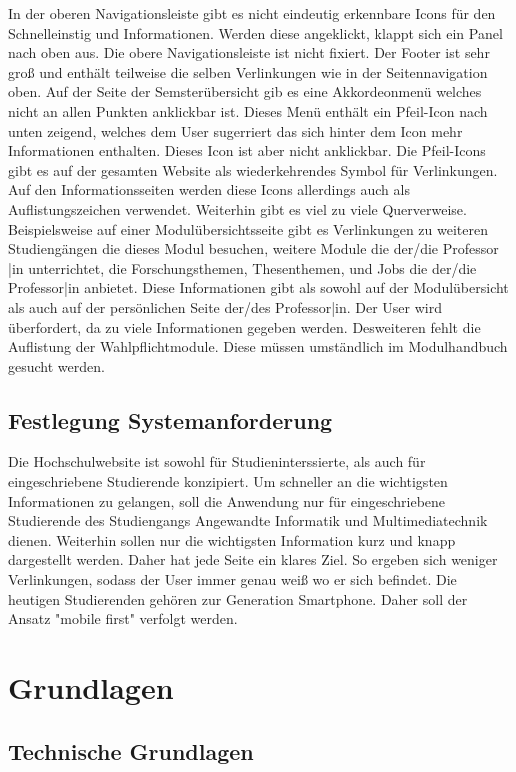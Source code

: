 \documentclass[12pt,					%
							 oneside,			%
							 a4paper,			%
							 halfparskip,		%
							 liststotoc,			%
							 bibtotoc,			%
							 fleqn,				%
							 pointlessnumbers]	%
							 {scrreprt}
\begin{document}
		In der oberen Navigationsleiste gibt es nicht eindeutig erkennbare Icons für den Schnelleinstig und Informationen. Werden diese angeklickt, klappt sich ein Panel nach oben aus. Die obere Navigationsleiste ist nicht fixiert. Der Footer ist sehr groß und enthält teilweise die selben Verlinkungen wie in der Seitennavigation oben. Auf der Seite der Semsterübersicht gib es eine Akkordeonmenü welches nicht an allen Punkten anklickbar ist. Dieses Menü enthält ein Pfeil-Icon nach unten zeigend, welches dem User sugerriert das sich hinter dem Icon mehr Informationen enthalten.  Dieses Icon ist aber nicht anklickbar. Die Pfeil-Icons gibt es auf der gesamten Website als wiederkehrendes Symbol für Verlinkungen. Auf den Informationsseiten werden diese Icons allerdings auch als Auflistungszeichen verwendet. Weiterhin gibt es viel zu viele Querverweise. Beispielsweise auf einer Modulübersichtsseite gibt es Verlinkungen zu weiteren Studiengängen die dieses Modul besuchen, weitere Module die der/die Professor |in unterrichtet, die Forschungsthemen, Thesenthemen, und Jobs die der/die Professor|in anbietet. Diese Informationen gibt als sowohl auf der Modulübersicht als auch auf der persönlichen Seite der/des Professor|in. Der User wird überfordert, da zu viele Informationen gegeben werden. Desweiteren fehlt die Auflistung der Wahlpflichtmodule. Diese müssen umständlich im Modulhandbuch gesucht werden. 
		
		\section{Festlegung Systemanforderung}
		Die Hochschulwebsite ist sowohl für Studieninterssierte, als auch für eingeschriebene Studierende konzipiert. Um schneller an die wichtigsten Informationen zu gelangen, soll die Anwendung nur für eingeschriebene Studierende des Studiengangs Angewandte Informatik und Multimediatechnik dienen. Weiterhin sollen nur die wichtigsten Information kurz und knapp dargestellt werden. Daher hat jede Seite ein klares Ziel.	So ergeben sich weniger Verlinkungen, sodass der User immer genau weiß wo er sich befindet. Die heutigen Studierenden gehören zur Generation Smartphone. Daher soll der Ansatz "mobile first" verfolgt werden.
	

\chapter{Grundlagen}				
		\section{Technische Grundlagen}
\end{document}
